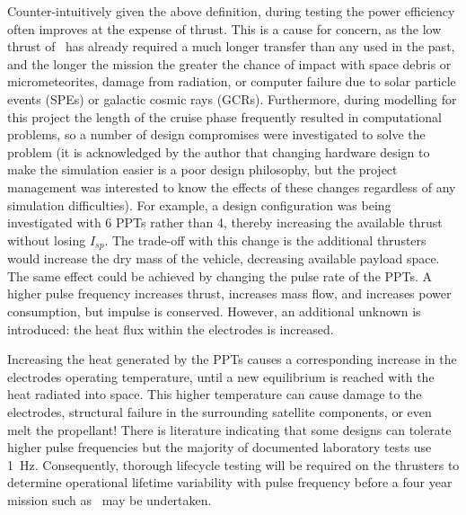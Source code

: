 Counter-intuitively given the above definition, during testing the power efficiency often improves at the expense of thrust. This is a cause for concern, as the low thrust of \BW\ has already required a much longer transfer than any used in the past, and the longer the mission the greater the chance of impact with space debris or micrometeorites, damage from radiation, or computer failure due to solar particle events (SPEs) or galactic cosmic rays (GCRs). Furthermore, during modelling for this project the length of the cruise phase frequently resulted in computational problems, so a number of design compromises were investigated to solve the problem (it is acknowledged by the author that changing hardware design to make the simulation easier is a poor design philosophy, but the project management was interested to know the effects of these changes regardless of any simulation difficulties). For example, a design configuration was being investigated with 6 PPTs rather than 4, thereby increasing the available thrust without losing $I_{sp}$. The trade-off with this change is the additional thrusters would increase the dry mass of the vehicle, decreasing available payload space. The same effect could be achieved by changing the pulse rate of the PPTs. A higher pulse frequency increases thrust, increases mass flow, and increases power consumption, but impulse is conserved. However, an additional unknown is introduced: the heat flux within the electrodes is increased. 


Increasing the heat generated by the PPTs causes a corresponding increase in the electrodes operating temperature, until a new equilibrium is reached with the heat radiated into space. This higher temperature can cause damage to the electrodes, structural failure in the surrounding satellite components, or even melt the propellant! There is literature indicating that some designs can tolerate higher pulse frequencies \parencite{Mueller2000,Cabrera2011} but the majority of documented laboratory tests use 1~Hz. Consequently, thorough lifecycle testing will be required on the thrusters to determine operational lifetime variability with pulse frequency before a four year mission such as \BW\ may be undertaken. 

